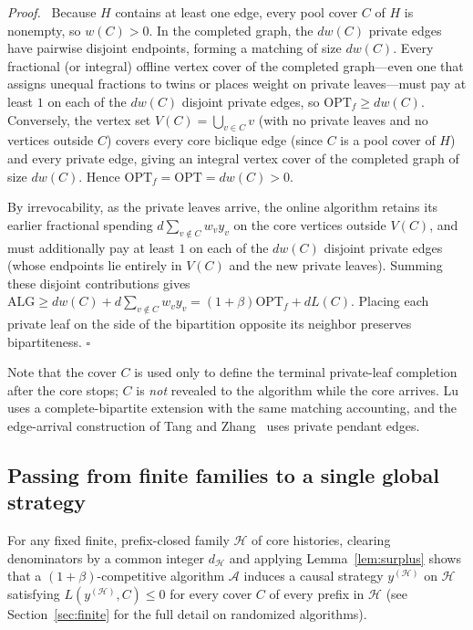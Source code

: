 \documentclass[11pt,letterpaper]{article}
\newenvironment{proof}[1][Proof]{\par\smallskip\noindent\textit{#1.}\ \ignorespaces}{\hfill$\square$\par\medskip}
\begin{document}
\begin{proof}
Because $H$ contains at least one edge, every pool cover $C$ of $H$ is nonempty, so $w(C)>0$. In the completed graph, the $d w(C)$ private edges have pairwise disjoint endpoints, forming a matching of size $d w(C)$. Every fractional (or integral) offline vertex cover of the completed graph---even one that assigns unequal fractions to twins or places weight on private leaves---must pay at least $1$ on each of the $d w(C)$ disjoint private edges, so $\mathrm{OPT}_f\ge d w(C)$. Conversely, the vertex set $V(C)=\bigcup_{v\in C} v$ (with no private leaves and no vertices outside $C$) covers every core biclique edge (since $C$ is a pool cover of $H$) and every private edge, giving an integral vertex cover of the completed graph of size $d w(C)$. Hence $\mathrm{OPT}_f = \mathrm{OPT} = d w(C) > 0$.

By irrevocability, as the private leaves arrive, the online algorithm retains its earlier fractional spending $d\sum_{v\notin C} w_v y_v$ on the core vertices outside $V(C)$, and must additionally pay at least $1$ on each of the $d w(C)$ disjoint private edges (whose endpoints lie entirely in $V(C)$ and the new private leaves). Summing these disjoint contributions gives $\mathrm{ALG}\ge d w(C) + d\sum_{v\notin C} w_v y_v = (1+\beta)\mathrm{OPT}_f + d L(C)$. Placing each private leaf on the side of the bipartition opposite its neighbor preserves bipartiteness.
\end{proof}

Note that the cover $C$ is used only to define the terminal private-leaf completion after the core stops; $C$ is \emph{not} revealed to the algorithm while the core arrives. Lu~\cite{lu} uses a complete-bipartite extension with the same matching accounting, and the edge-arrival construction of Tang and Zhang~\cite{tz} uses private pendant edges.

\subsection{Passing from finite families to a single global strategy}

For any fixed finite, prefix-closed family $\mathcal H$ of core histories, clearing denominators by a common integer $d_{\mathcal H}$ and applying Lemma~\ref{lem:surplus} shows that a $(1+\beta)$-competitive algorithm $\mathcal A$ induces a causal strategy $y^{(\mathcal H)}$ on $\mathcal H$ satisfying $L(y^{(\mathcal H)},C)\le 0$ for every cover $C$ of every prefix in $\mathcal H$ (see Section~\ref{sec:finite} for the full detail on randomized algorithms).
\end{document}
